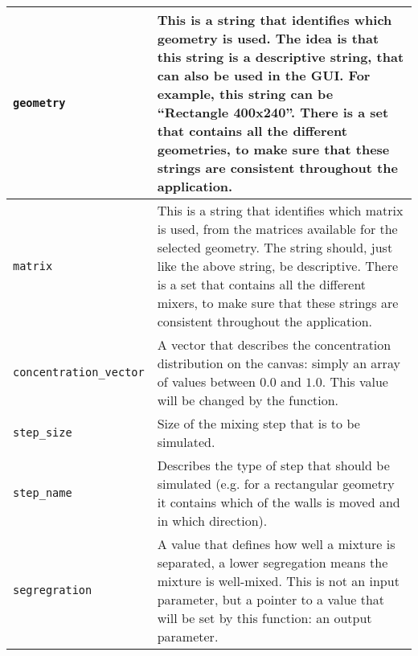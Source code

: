 \begin{longtable}{@{}lX@{}}
	\toprule
	\endfirsthead
	\midrule
	\endhead
	
	\texttt{geometry} & This is a string that identifies which geometry is used. The idea is that this string is a descriptive string, that can also be used in the GUI. For example, this string can be ``Rectangle 400x240''. There is a set that contains all the different geometries, to make sure that these strings are consistent throughout the application. \\
	\midrule
	
	\texttt{matrix} & This is a string that identifies which matrix is used, from the matrices available for the selected geometry. The string should, just like the above string, be descriptive. There is a set that contains all the different mixers, to make sure that these strings are consistent throughout the application. \\
	\midrule
	
	\texttt{concentration\_vector} & A vector that describes the concentration distribution on the canvas: simply an array of values between $0.0$ and $1.0$. This value will be changed by the function. \\
	\midrule
	
	\texttt{step\_size} & Size of the mixing step that is to be simulated. \\
	\midrule
	
	\texttt{step\_name} & Describes the type of step that should be simulated (e.g. for a rectangular geometry it contains which of the walls is moved and in which direction). \\
	\midrule
	
	\texttt{segregration} & A value that defines how well a mixture is separated, a lower segregation means the mixture is well-mixed. This is not an input parameter, but a pointer to a value that will be set by this function: an output parameter. \\
	\bottomrule
\end{longtable}